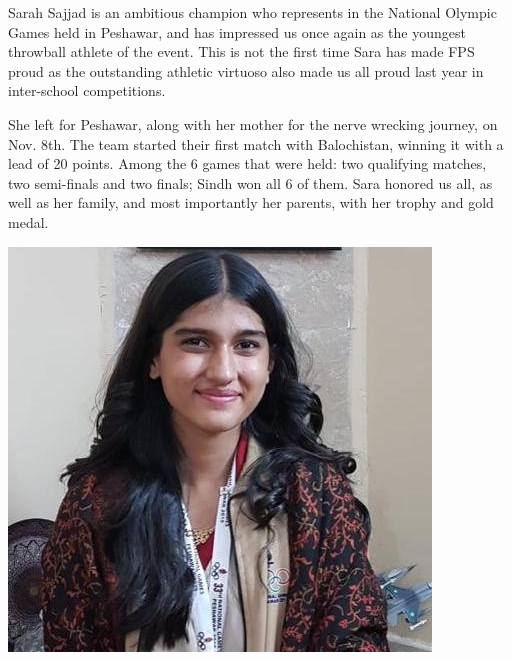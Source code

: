 \documentclass{article}
\begin{document}
\closearticle

\begin{multicols}{2}


Sarah Sajjad is an ambitious champion who represents in the National Olympic Games held in Peshawar, and has impressed us once again as the youngest throwball athlete of the event. This is not the first time Sara has made FPS proud as the outstanding athletic virtuoso also made us all proud last year in inter-school competitions. 

She left for Peshawar, along with her mother for the nerve wrecking journey, on Nov. 8th. The team started their first match with Balochistan, winning it with a lead of 20 points. Among the 6 games that were held: two qualifying matches, two semi-finals and two finals; Sindh won all 6 of them. Sara honored us all, as well as her family, and most importantly her parents, with her trophy and gold medal.  




\begin{center}
    \includegraphics[scale=0.4]{athlete}    
\end{center}






\end{multicols}
\end{document}
